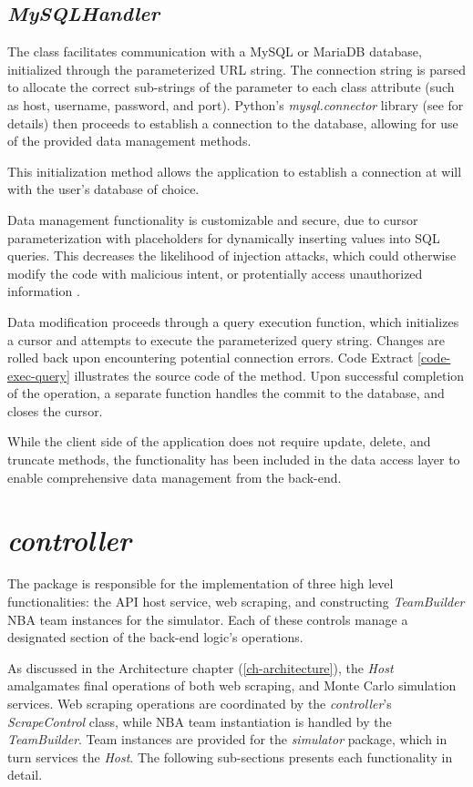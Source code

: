 \documentclass{thesis-ekf}
\theoremstyle{definition}
\theoremstyle{remark}
\begin{document}
\subsection{\emph{MySQLHandler}}
The class facilitates communication with a MySQL or MariaDB database, initialized through the parameterized URL string. The connection string is parsed to allocate the correct sub-strings of the parameter to each class attribute (such as host, username, password, and port). Python's \emph{mysql.connector} library (see \cite{mysql.conn} for details) then proceeds to establish a connection to the database, allowing for use of the provided data management methods.

This initialization method allows the application to establish a connection at will with the user's database of choice. 

Data management functionality is customizable and secure, due to cursor parameterization with placeholders for dynamically inserting values into SQL queries. This decreases the likelihood of injection attacks, which could otherwise modify the code with malicious intent, or protentially access unauthorized information \cite{injection-attack}.

Data modification proceeds through a query execution function, which initializes a cursor and attempts to execute the parameterized query string. Changes are rolled back upon encountering potential connection errors. Code Extract \ref{code-exec-query} illustrates the source code of the method. Upon successful completion of the operation, a separate function handles the commit to the database, and closes the cursor.


While the client side of the application does not require update, delete, and truncate methods, the functionality has been included in the data access layer to enable comprehensive data management from the back-end.

\section{\emph{controller}}
The package is responsible for the implementation of three high level functionalities: the API host service, web scraping, and constructing \emph{TeamBuilder} NBA team instances for the simulator. Each of these controls manage a designated section of the back-end logic's operations. 

As discussed in the Architecture chapter (\ref{ch-architecture}), the \emph{Host} amalgamates final operations of both web scraping, and Monte Carlo simulation services. Web scraping operations are coordinated by the \emph{controller}'s \emph{ScrapeControl} class, while NBA team instantiation is handled by the \emph{TeamBuilder}. Team instances are provided for the \emph{simulator} package, which in turn services the \emph{Host}. The following sub-sections presents each functionality in detail.
\end{document}
